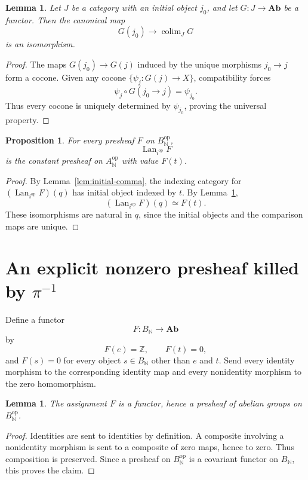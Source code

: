 \documentclass[11pt]{article}
\newtheorem{lemma}[theorem]{Lemma}
\newtheorem{proposition}[theorem]{Proposition}
\theoremstyle{definition}
\theoremstyle{remark}
\newcommand{\op}{{\mathrm{op}}}
\newcommand{\Lan}{\operatorname{Lan}}
\newcommand{\colim}{\operatorname{colim}}
\newcommand{\N}{\mathbb N}
\newcommand{\Z}{\mathbb Z}
\begin{document}
\begin{lemma}\label{lem:initial-colimit}
Let \(J\) be a category with an initial object \(j_0\), and let
\(G\colon J\to\mathbf{Ab}\) be a functor.  Then the canonical map
\[
G(j_0)\longrightarrow\colim_JG
\]
is an isomorphism.
\end{lemma}

\begin{proof}
The maps \(G(j_0)\to G(j)\) induced by the unique morphisms
\(j_0\to j\) form a cocone.  Given any cocone
\(\{\psi_j\colon G(j)\to X\}\), compatibility forces
\[
\psi_j\circ G(j_0\to j)=\psi_{j_0}.
\]
Thus every cocone is uniquely determined by \(\psi_{j_0}\), proving
the universal property.
\end{proof}

\begin{proposition}\label{prop:Lan-constant}
For every presheaf \(F\) on \(B_{\N}^{\op}\),
\[
\Lan_{i^\op}F
\]
is the constant presheaf on \(A_{\N}^{\op}\) with value \(F(t)\).
\end{proposition}

\begin{proof}
By Lemma~\ref{lem:initial-comma}, the indexing category for
\((\Lan_{i^\op}F)(q)\) has initial object indexed by \(t\).  By
Lemma~\ref{lem:initial-colimit},
\[
(\Lan_{i^\op}F)(q)\simeq F(t).
\]
These isomorphisms are natural in \(q\), since the initial objects
and the comparison maps are unique.
\end{proof}

\section{An explicit nonzero presheaf killed by \(\pi^{-1}\)}

Define a functor
\[
F\colon B_{\N}\longrightarrow\mathbf{Ab}
\]
by
\[
F(e)=\Z,\qquad F(t)=0,
\]
and \(F(s)=0\) for every object \(s\in B_{\N}\) other than \(e\) and
\(t\).  Send every identity morphism to the corresponding identity map
and every nonidentity morphism to the zero homomorphism.

\begin{lemma}
The assignment \(F\) is a functor, hence a presheaf of abelian groups
on \(B_{\N}^{\op}\).
\end{lemma}

\begin{proof}
Identities are sent to identities by definition.  A composite
involving a nonidentity morphism is sent to a composite of zero maps,
hence to zero.  Thus composition is preserved.  Since a presheaf on
\(B_{\N}^{\op}\) is a covariant functor on \(B_{\N}\), this proves the
claim.
\end{proof}
\end{document}
